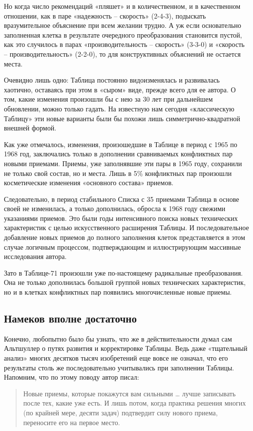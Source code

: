 \documentclass[11pt,a4paper]{article}
\begin{document}
Но когда число рекомендаций «пляшет» и в количественном, и в качественном
отношении, как в паре «надежность -- скорость» (2-4-3), подыскать
вразумительное объяснение при всем желании трудно. А уж если основательно
заполненная клетка в результате очередного преобразования становится пустой,
как это случилось в парах «производительность -- скорость» (3-3-0) и «скорость
-- производительность» (2-2-0), то для конструктивных объяснений не остается
места.

Очевидно лишь одно: Таблица постоянно видоизменялась и развивалась хаотично,
оставаясь при этом в «сыром» виде, прежде всего для ее автора. О том, какие
изменения произошли бы с нею за 30 лет при дальнейшем обновлении, можно только
гадать. На известную нам сегодня «классическую Таблицу» эти новые варианты
были бы похожи лишь симметрично-квадратной внешней формой.

Как уже отмечалось, изменения, произошедшие в Таблице в период с 1965 по 1968
год, заключались только в дополнении сравниваемых конфликтных пар новыми
приемами. Приемы, уже заполнявшие эти пары в 1965 году, сохранили не только
свой состав, но и места. Лишь в 5\% конфликтных пар произошли косметические
изменения «основного состава» приемов.

Следовательно, в период стабильного Списка с 35 приемами Таблица в основе
своей не изменилась, а только дополнилась, обросла к 1968 году свежими
указаниями приемов. Это были годы интенсивного поиска новых технических
характеристик с целью искусственного расширения Таблицы. И последовательное
добавление новых приемов до полного заполнения клеток представляется в этом
случае логичным процессом, подтверждающим и иллюстрирующим массивные
исследования автора.

Зато в Таблице-71 произошли уже по-настоящему радикальные преобразования. Она
не только дополнилась большой группой новых технических характеристик, но и в
клетках конфликтных пар появились многочисленные новые приемы.

\subsection*{Намеков вполне достаточно}

Конечно, любопытно было бы узнать, что же в действительности думал сам
Альтшуллер о путях развития и корректировке Таблицы. Ведь даже «тщательный
анализ» многих десятков тысяч изобретений еще вовсе не означал, что его
результаты столь же последовательно учитывались при заполнении Таблицы.
Напомним, что по этому поводу автор писал:
\begin{quote}
  Новые приемы, которые покажутся вам сильными … лучше записывать после тех,
  какие уже есть. И лишь потом, когда практика решения многих (по крайней
  мере, десяти задач) подтвердит силу нового приема, переносите его на первое
  место.  \cite[стр. 274]{Altshuller1973}
\end{quote}
\end{document}
